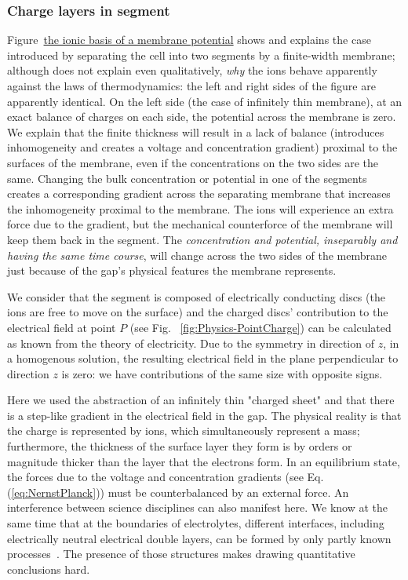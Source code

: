 \subsubsection[Charge layers]{Charge layers in segment\label{sec:Physics-LayersInSegment}}

Figure~\href{https://www.ncbi.nlm.nih.gov/books/NBK26910/figure/A2034/?report=objectonly}
{the ionic basis of a membrane potential} shows and explains the case
introduced by separating the cell into two segments by a  finite-width membrane; although does not explain even qualitatively, \textit{why} the ions behave apparently against the laws of thermodynamics: the left and right sides of the figure are apparently identical. On the left side (the case of infinitely thin membrane), 
at an exact balance of charges on each side, the potential across the membrane is zero. 
We explain that the finite thickness will result in
a lack of balance (introduces inhomogeneity and creates a voltage and concentration gradient) proximal to the surfaces of the membrane, even if the concentrations on the two sides are the same. Changing the
bulk concentration or potential in one of the segments creates a corresponding
gradient across the separating membrane that increases the inhomogeneity proximal to the membrane.
The ions will experience an extra force due to the gradient,
but the mechanical counterforce of the membrane will keep them back in the segment. The \emph{concentration and
	potential, inseparably and having the same time course}, will change
across the two sides of the membrane just because of the gap's physical
features the membrane represents. 

We consider that the segment is composed of electrically conducting discs (the ions are free to move on the surface) and the charged discs' contribution to the 
electrical field at point $P$ (see Fig.~ \ref{fig:Physics-PointCharge}) can be calculated as known from the 
theory of electricity. Due to the symmetry in direction of $z$, in a homogenous solution, the resulting electrical field in the plane perpendicular to direction $z$ is zero: we have  contributions of the same size with opposite signs. 

Here we used the abstraction of an infinitely thin "charged sheet" and that there is a step-like
gradient in the electrical field in the gap. The physical reality is that the charge is represented by ions, which simultaneously represent a mass; furthermore, the thickness of the surface layer they form is by orders or magnitude thicker than the layer that the electrons form. In an equilibrium state, the forces due to the voltage and concentration gradients (see Eq.(\ref{eq:NernstPlanck})) must be counterbalanced by an external force.
%
An interference between science disciplines can also manifest here. We know at the same time that at the boundaries of electrolytes, different interfaces, including electrically neutral electrical double layers, can be formed by only partly known 
processes~\cite{ElectricDoubleLayer:2023}. The presence of those structures makes drawing quantitative conclusions hard.


